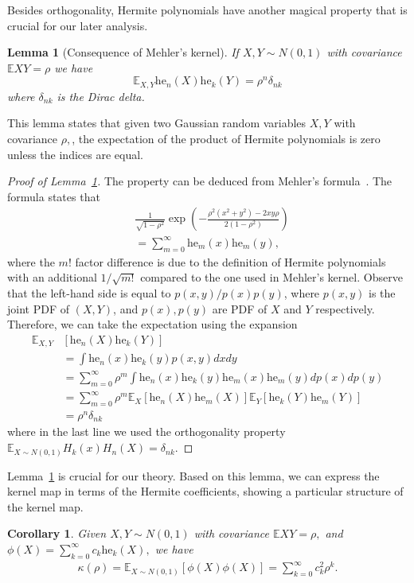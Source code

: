\documentclass[twoside]{article}
\newcommand{\E}{\mathbb{E}}
\newcommand{\he}{\mathrm{he}}
\newtheorem{lemma}{Lemma}
\newtheorem{corollary}{Corollary}
\theoremstyle{definition}
\begin{document}
Besides orthogonality, Hermite polynomials have another magical property that is crucial for our later analysis. 

\begin{lemma}[Consequence of Mehler's kernel]\label{lem:mehler_kernel}
If $X,Y \sim N(0,1)$ with covariance $\E XY = \rho$ we have 
$$\E_{X,Y} \he_n(X)\he_k(Y) = \rho^n \delta_{nk}$$
where $\delta_{nk}$ is the Dirac delta.  
\end{lemma}

This lemma states that given two Gaussian random variables $X, Y$ with covariance $\rho,$, the expectation of the product of Hermite polynomials is zero unless the indices are equal. 

\begin{proof}[Proof of Lemma~\ref{lem:mehler_kernel}]
The property can be deduced from Mehler's formula~\citet{mehler1866ueber}. The formula states that 
\begin{align*}
&\frac{1}{\sqrt{1-\rho^2}}\exp\left(-\frac{\rho^2(x^2+y^2)-2xy\rho}{2(1-\rho^2)}\right) \\
&= \sum_{m=0}^\infty \he_m(x)\he_m(y),
\end{align*}
where the $m!$ factor difference is due to the definition of Hermite polynomials with an additional $1/\sqrt{m!}$ compared to the one used in Mehler's kernel. 
Observe that the left-hand side is equal to $p(x,y)/p(x)p(y)$, where $p(x,y)$ is the joint PDF of $(X, Y)$, and $p(x),p(y)$ are PDF of $X$ and $Y$ respectively. Therefore, we can take the expectation using the expansion 
\begin{align*}
\E_{X,Y}&\left[ \he_n(X) \he_k(Y)\right] \\
&= \int \he_n(x)\he_k(y)p(x,y)dx dy \\
&=  \sum_{m=0}^\infty \rho^m\int \he_n(x)\he_k(y) \he_m(x)\he_m(y) dp(x)dp(y)\\
&= \sum_{m=0}^\infty \rho^m\E_{X} \left[\he_n(X)\he_m(X)\right]\E_{Y} \left[\he_k(Y)\he_m(Y)\right] \\
&= \rho^n \delta_{nk} 
\end{align*}
where in the last line we used the orthogonality property $\E_{X\sim N(0,1)} H_k(x) H_n(X)=\delta_{nk}$. 
\end{proof}

Lemma~\ref{lem:mehler_kernel} is crucial for our theory. Based on this lemma, we can express the kernel map in terms of the Hermite coefficients, showing a particular structure of the kernel map.

\begin{corollary}
    \label{cor:hermite_covariance}
    \label{cor:kernel_map}
Given $X,Y \sim N(0,1)$ with covariance $\E X Y = \rho,$ and $\phi(X) = \sum_{k=0}^\infty c_k \he_k(X),$ we have
\begin{align*}
\kappa(\rho) = \E_{X\sim N(0,1)} \left[\phi(X)\phi(X)\right] = \sum_{k=0}^\infty c_k^2 \rho^k.
\end{align*}
\end{corollary}
\end{document}
